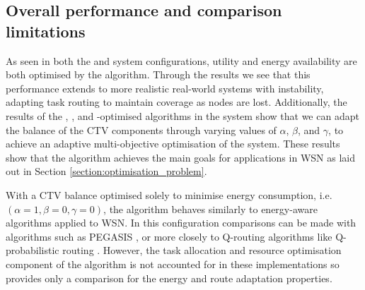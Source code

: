 \subsection{Overall performance and comparison limitations}
As seen in both the \simulationSimple{}{}  and \simulationNodeFailure{}{} system configurations, utility and energy availability are both optimised by the algorithm. Through the \simulationNodeFailure{}{} results we see that this performance extends to more realistic real-world systems with instability, adapting task routing to maintain coverage as nodes are lost.  Additionally, the results of the \algorithmEnergy{}{}, \algorithmQuality{}{}, and \algorithmDistribution{}{}-optimised algorithms in the \simulationExtended{}{} system show that we can adapt the balance of the CTV components through varying values of $\alpha$, $\beta$, and $\gamma$, to achieve an adaptive multi-objective optimisation of the system. These results show that the algorithm achieves the main goals for applications in WSN as laid out in Section \ref{section:optimisation_problem}.

With a CTV balance optimised solely to minimise energy consumption, i.e. $(\alpha=1,\beta=0,\gamma=0)$, the \acronymWSNOptimisation{}{} algorithm behaves similarly to energy-aware algorithms applied to WSN. In this configuration comparisons can be made with algorithms such as PEGASIS \citep{Lindsey2002}, or more closely to Q-routing algorithms like Q-probabilistic routing \citep{Arroyo-Valles2007}. However, the task allocation and resource optimisation component of the \acronymWSNOptimisation{}{} algorithm is not accounted for in these implementations so provides only a comparison for the energy and route adaptation properties. 
